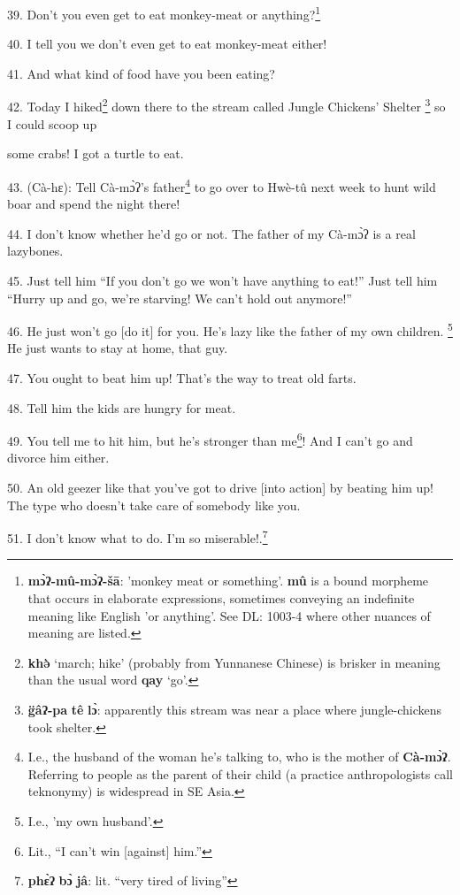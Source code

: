 39. Don't you even get to eat monkey-meat or anything?\footnote{\textbf{mɔ̀ʔ-mû-mɔ̀ʔ-šā}: 'monkey meat or something'. \textbf{mû} is a bound morpheme that occurs in elaborate expressions, sometimes conveying an indefinite meaning like English 'or anything'. See DL: 1003-4 where other nuances of meaning are listed.}

40. I tell you we don't even get to eat monkey-meat either!

41. And what kind of food have you been eating?

42. Today I hiked\footnote{\textbf{khə̀} `march; hike' (probably from Yunnanese Chinese) is brisker in meaning than the usual word \textbf{qay} `go'.} down there to the stream called Jungle Chickens' Shelter
\footnote{\textbf{g̈âʔ-pa} \textbf{tê} \textbf{lɔ̀}: apparently this stream was near a place where jungle-chickens took shelter.} so I could scoop up

some crabs! I got a turtle to eat.


43. (Cà-hɛ): Tell Cà-mɔ̀ʔ's father\footnote{I.e., the husband of the woman he's talking to, who is the mother of \textbf{Cà-mɔ̀ʔ}. Referring to people as the parent of their child (a practice anthropologists call teknonymy) is widespread in SE Asia.} to go over to Hwè-tû next week
to hunt wild boar and spend the night there!

44. I don't know whether he'd go or not. The father of my Cà-mɔ̀ʔ is a real
lazybones.

45. Just tell him ``If you don't go we won't have anything to eat!'' Just tell
him ``Hurry up and go, we're starving! We can't hold out anymore!''

46. He just won't go [do it] for you. He's lazy like the father of my own children.
\footnote{I.e., 'my own husband'.} He just wants to stay at home, that guy.

47. You ought to beat him up! That's the way to treat old farts.

48. Tell him the kids are hungry for meat.

49. You tell me to hit him, but he's stronger than me\footnote{Lit., ``I can't win [against] him.''}! And I can't go and
divorce him either.

50. An old geezer like that you've got to drive [into action] by beating him up!
The type who doesn't take care of somebody like you.

51. I don't know what to do. I'm so miserable!.\footnote{\textbf{phɛ̀ʔ} \textbf{bɔ̀} \textbf{jâ}: lit. ``very tired of living''}

